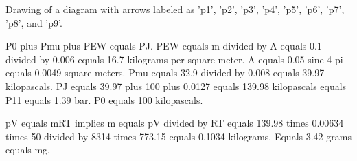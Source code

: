 Drawing of a diagram with arrows labeled as 'p1', 'p2', 'p3', 'p4', 'p5', 'p6', 'p7', 'p8', and 'p9'.

P0 plus Pmu plus PEW equals PJ.  
PEW equals m divided by A equals 0.1 divided by 0.006 equals 16.7 kilograms per square meter.  
A equals 0.05 sine 4 pi equals 0.0049 square meters.  
Pmu equals 32.9 divided by 0.008 equals 39.97 kilopascals.  
PJ equals 39.97 plus 100 plus 0.0127 equals 139.98 kilopascals equals P11 equals 1.39 bar.  
P0 equals 100 kilopascals.  

pV equals mRT implies m equals pV divided by RT equals 139.98 times 0.00634 times 50 divided by 8314 times 773.15 equals 0.1034 kilograms.  
Equals 3.42 grams equals mg.